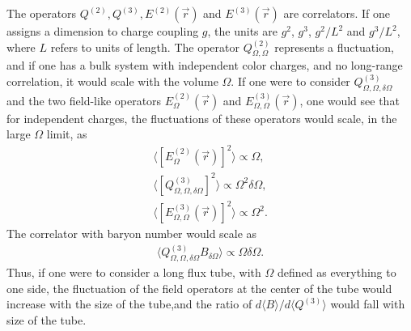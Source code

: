 \documentclass[aps, prc, 12pt, nofootinbib, showpacs, superscriptaddress, tightenlines, groupedaddress]{revtex4-2}
\begin{document}
The operators $Q^{(2)}, Q^{(3)},E^{(2)}(\vec{r})$ and $E^{(3)}(\vec{r})$ are correlators. If one assigns a dimension to charge coupling $g$, the units are $g^2$, $g^3$, $g^2/L^2$ and $g^3/L^2$, where $L$ refers to units of length. The operator $Q^{(2)}_{\Omega,\Omega}$ represents a fluctuation, and if one has a bulk system with independent color charges, and no long-range correlation, it would scale with the volume $\Omega$. If one were to consider $Q^{(3)}_{\Omega,\Omega,\delta\Omega}$ and the two field-like operators $E^{(2)}_{\Omega}(\vec{r})$ and $E^{(3)}_{\Omega,\Omega}(\vec{r})$, one would see that for independent charges, the fluctuations of these operators would scale, in the large $\Omega$ limit, as
\begin{eqnarray}
\langle [E^{(2)}_{\Omega}(\vec{r})]^2\rangle\propto \Omega,\\
\nonumber
\langle [Q^{(3)}_{\Omega,\Omega,\delta\Omega}]^2\rangle \propto \Omega^2\delta\Omega,\\
\nonumber
\langle [E^{(3)}_{\Omega,\Omega}(\vec{r})]^2\rangle\propto \Omega^2.
\end{eqnarray}
The correlator with baryon number would scale as
\begin{eqnarray}
\langle Q^{(3)}_{\Omega,\Omega,\delta\Omega}B_{\delta\Omega}\rangle\propto \Omega\delta\Omega.
\end{eqnarray}
Thus, if one were to consider a long flux tube, with $\Omega$ defined as everything to one side, the fluctuation of the field operators at the center of the tube would increase with the size of the tube,and the ratio of $d\langle B\rangle/d\langle Q^{(3)}\rangle$ would fall with size of the tube. 
\end{document}

